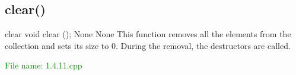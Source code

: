 
\subsection{clear()} %
\begin{methodinfo}
  {clear}
  {void clear ();}
  {None}
  {None}
  {This function removes all the elements from the collection and sets its size to 0. 
  During the removal, the destructors are called.}
\end{methodinfo}

\textcolor{green}{File name: 1.4.11.cpp}

